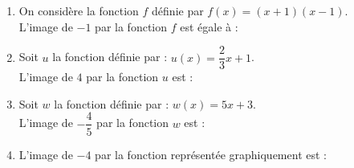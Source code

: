\documentclass[a4paper,11pt]{article}
\begin{document}
\begin{seance}{} %

\begin{enumerate}
\item On considère la fonction $f$ définie par $f(x)= (x+1)(x-1)$. \\L'image de $-1$ par la fonction $f$ est égale à : \dotfill

\item Soit $u$ la fonction définie par : $u(x)=\dfrac{2}{3}x+1$.\\L'image de $4$ par la fonction $u$ est : \dotfill

\item Soit $w$ la fonction définie par : $w(x)=5x+3$.\\L'image de $-\dfrac{4}{5}$ par la fonction $w$ est : \dotfill

\item  L'image de $-4$ par la fonction représentée graphiquement est : \dotfill 
\begin{center}
 \begin{tikzpicture}[baseline,scale = 0.7]


\end{tikzpicture}
\end{center}
\end{enumerate}
\end{seance}
\end{document}
